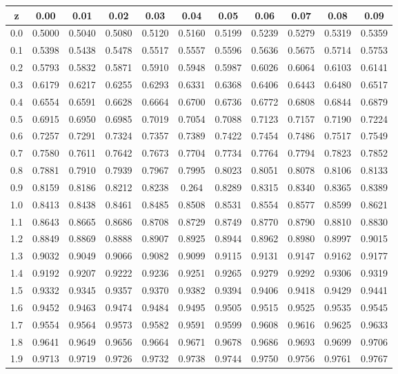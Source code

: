 \documentclass{article}
\numberwithin{equation}{section}
\theoremstyle{plain}  %
\begin{document}
\begin{tabular}{|c|c|c|c|c|c|c|c|c|c|c|} 
\hline
z	& 0.00	&0.01	&0.02	&0.03	&0.04	&0.05	&0.06	&0.07	&0.08	&0.09   \\ \hline
0.0	& 0.5000&0.5040	&0.5080	&0.5120	&0.5160	&0.5199	&0.5239	&0.5279	&0.5319	&0.5359\\
0.1	& 0.5398&0.5438	&0.5478	&0.5517	&0.5557	&0.5596	&0.5636	&0.5675	&0.5714	&0.5753\\
0.2	& 0.5793&0.5832	&0.5871	&0.5910	&0.5948	&0.5987	&0.6026	&0.6064	&0.6103	&0.6141\\
0.3	& 0.6179&0.6217	&0.6255	&0.6293	&0.6331	&0.6368	&0.6406	&0.6443	&0.6480	&0.6517\\
0.4	& 0.6554&0.6591	&0.6628	&0.6664	&0.6700	&0.6736	&0.6772	&0.6808	&0.6844	&0.6879\\
0.5	& 0.6915&0.6950	&0.6985	&0.7019	&0.7054	&0.7088	&0.7123	&0.7157	&0.7190	&0.7224\\
0.6	& 0.7257&0.7291	&0.7324	&0.7357	&0.7389	&0.7422	&0.7454	&0.7486	&0.7517	&0.7549\\
0.7	& 0.7580&0.7611	&0.7642	&0.7673	&0.7704	&0.7734	&0.7764	&0.7794	&0.7823	&0.7852\\
0.8	& 0.7881&0.7910	&0.7939	&0.7967	&0.7995	&0.8023	&0.8051	&0.8078	&0.8106	&0.8133\\
0.9	& 0.8159&0.8186	&0.8212	&0.8238	&0.264	&0.8289	&0.8315	&0.8340	&0.8365	&0.8389 \\ 
1.0	&0.8413&0.8438	&0.8461& 0.8485& 0.8508&0.8531&	0.8554&	0.8577&	0.8599&	0.8621 \\ 
1.1	&0.8643&0.8665	&0.8686& 0.8708& 0.8729&0.8749&	0.8770&	0.8790&	0.8810&	0.8830 \\ 
1.2	&0.8849&0.8869	&0.8888& 0.8907& 0.8925&0.8944&	0.8962&	0.8980&	0.8997&	0.9015 \\ 
1.3	&0.9032&0.9049	&0.9066& 0.9082& 0.9099&0.9115&	0.9131&	0.9147&	0.9162&	0.9177 \\ 
1.4	&0.9192&0.9207	&0.9222& 0.9236& 0.9251&0.9265&	0.9279&	0.9292&	0.9306&	0.9319 \\ 
1.5	&0.9332&0.9345	&0.9357& 0.9370& 0.9382&0.9394&	0.9406&	0.9418&	0.9429&	0.9441 \\ 
1.6	&0.9452&0.9463	&0.9474& 0.9484& 0.9495&0.9505&	0.9515&	0.9525&	0.9535&	0.9545 \\ 
1.7	&0.9554&0.9564	&0.9573& 0.9582& 0.9591&0.9599&	0.9608&	0.9616&	0.9625&	0.9633 \\ 
1.8	&0.9641&0.9649	&0.9656& 0.9664& 0.9671&0.9678&	0.9686&	0.9693&	0.9699&	0.9706 \\ 
1.9	&0.9713&0.9719	&0.9726& 0.9732& 0.9738&0.9744&	0.9750&	0.9756&	0.9761&	0.9767 \\ 

\end{tabular}
\end{document}
